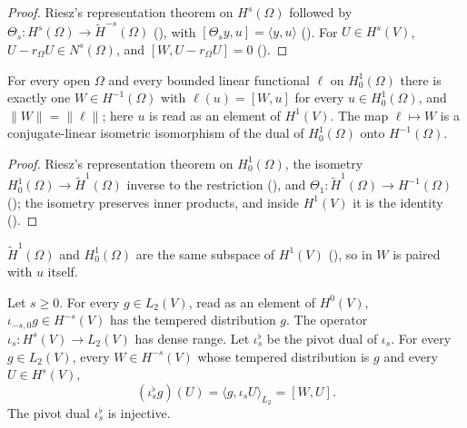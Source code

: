 \begin{proof}
\leanok
Riesz's representation theorem on $H^s(\Omega)$ followed by $\Theta_s : H^s(\Omega) \to
\tilde H^{-s}(\Omega)$ (), with
$[\Theta_s y, u] = \langle y, u \rangle$ (). For $U \in H^s(V)$,
$U - r_\Omega U \in N^s(\Omega)$, and $[W, U - r_\Omega U] = 0$
().
\end{proof}

\begin{corollary}
\label{cor:sobolev-duality-zero-boundary}
\leanok
{}
For every open $\Omega$ and every bounded linear functional $\ell$ on $H^1_0(\Omega)$ there is
exactly one $W \in H^{-1}(\Omega)$ with $\ell(u) = [W, u]$ for every $u \in H^1_0(\Omega)$, and
$\|W\| = \|\ell\|$; here $u$ is read as an element of $H^1(V)$. The map $\ell \mapsto W$ is a
conjugate-linear isometric isomorphism of the dual of $H^1_0(\Omega)$ onto $H^{-1}(\Omega)$.
\end{corollary}

\begin{proof}
\leanok
Riesz's representation theorem on $H^1_0(\Omega)$, the isometry $H^1_0(\Omega) \to
\tilde H^1(\Omega)$ inverse to the restriction (), and
$\Theta_1 : \tilde H^1(\Omega) \to H^{-1}(\Omega)$ (); the
isometry preserves inner products, and inside $H^1(V)$ it is the identity
().
\end{proof}

$\tilde H^1(\Omega)$ and $H^1_0(\Omega)$ are the same subspace of $H^1(V)$
(), so in  $W$ is
paired with $u$ itself.

\begin{theorem}
\label{thm:rd-gelfand-triple}
\leanok
{}
Let $s \geq 0$. For every $g \in L_2(V)$, read as an element of $H^0(V)$,
$\iota_{-s,0} g \in H^{-s}(V)$ has the tempered distribution $g$. The operator
$\iota_s : H^s(V) \to L_2(V)$ has dense range. Let $\iota_s^\flat$ be the pivot dual of
$\iota_s$. For every $g \in L_2(V)$, every $W \in H^{-s}(V)$ whose tempered distribution is $g$
and every $U \in H^s(V)$,
\[
  (\iota_s^\flat g)(U) = \langle g, \iota_s U \rangle_{L_2} = [W, U] .
\]
The pivot dual $\iota_s^\flat$ is injective.
\end{theorem}

